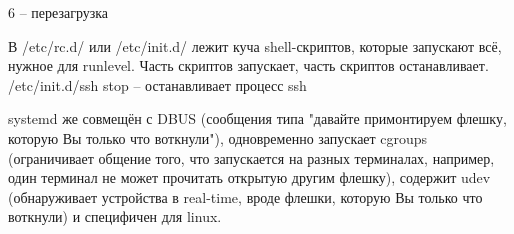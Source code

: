 \documentclass[a4paper,10pt]{article}
\begin{document}
\begin{enumerate}
6 -- перезагрузка

В /etc/rc.d/ или /etc/init.d/ лежит куча shell-скриптов, которые запускают всё, нужное для runlevel. Часть скриптов запускает, часть скриптов останавливает.
/etc/init.d/ssh stop -- останавливает процесс ssh

systemd же совмещён с DBUS (сообщения типа "давайте примонтируем флешку, которую Вы только что воткнули"), одновременно запускает cgroups (ограничивает общение того, что запускается на разных терминалах, например, один терминал не может прочитать открытую другим флешку), содержит udev (обнаруживает устройства в real-time, вроде флешки, которую Вы только что воткнули) и специфичен для linux.


\end{enumerate}
\end{document}
